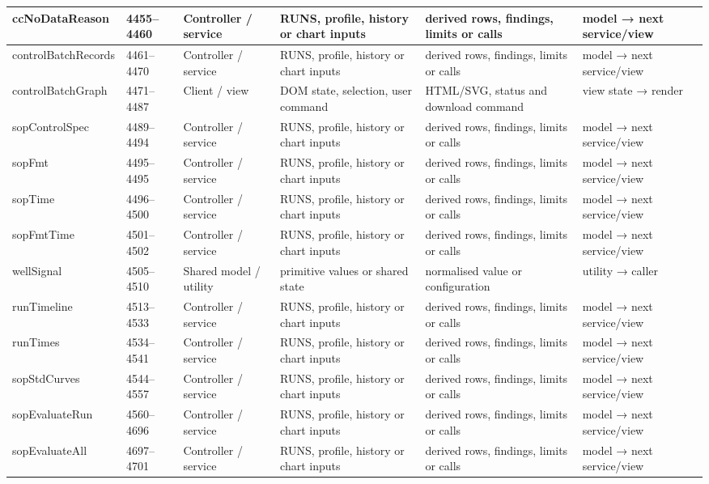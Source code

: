 \begin{landscape}
\begin{longtable}{@{}p{3.2cm}p{1.45cm}p{2.7cm}p{4.0cm}p{4.0cm}p{3.0cm}@{}}
ccNoDataReason & 4455--4460 & Controller / service & RUNS, profile, history or chart inputs & derived rows, findings, limits or calls & model → next service/view \\\hline
controlBatchRecords & 4461--4470 & Controller / service & RUNS, profile, history or chart inputs & derived rows, findings, limits or calls & model → next service/view \\\hline
controlBatchGraph & 4471--4487 & Client / view & DOM state, selection, user command & HTML/SVG, status and download command & view state → render \\\hline
sopControlSpec & 4489--4494 & Controller / service & RUNS, profile, history or chart inputs & derived rows, findings, limits or calls & model → next service/view \\\hline
sopFmt & 4495--4495 & Controller / service & RUNS, profile, history or chart inputs & derived rows, findings, limits or calls & model → next service/view \\\hline
sopTime & 4496--4500 & Controller / service & RUNS, profile, history or chart inputs & derived rows, findings, limits or calls & model → next service/view \\\hline
sopFmtTime & 4501--4502 & Controller / service & RUNS, profile, history or chart inputs & derived rows, findings, limits or calls & model → next service/view \\\hline
wellSignal & 4505--4510 & Shared model / utility & primitive values or shared state & normalised value or configuration & utility → caller \\\hline
runTimeline & 4513--4533 & Controller / service & RUNS, profile, history or chart inputs & derived rows, findings, limits or calls & model → next service/view \\\hline
runTimes & 4534--4541 & Controller / service & RUNS, profile, history or chart inputs & derived rows, findings, limits or calls & model → next service/view \\\hline
sopStdCurves & 4544--4557 & Controller / service & RUNS, profile, history or chart inputs & derived rows, findings, limits or calls & model → next service/view \\\hline
sopEvaluateRun & 4560--4696 & Controller / service & RUNS, profile, history or chart inputs & derived rows, findings, limits or calls & model → next service/view \\\hline
sopEvaluateAll & 4697--4701 & Controller / service & RUNS, profile, history or chart inputs & derived rows, findings, limits or calls & model → next service/view \\\hline

\end{longtable}
\end{landscape}
